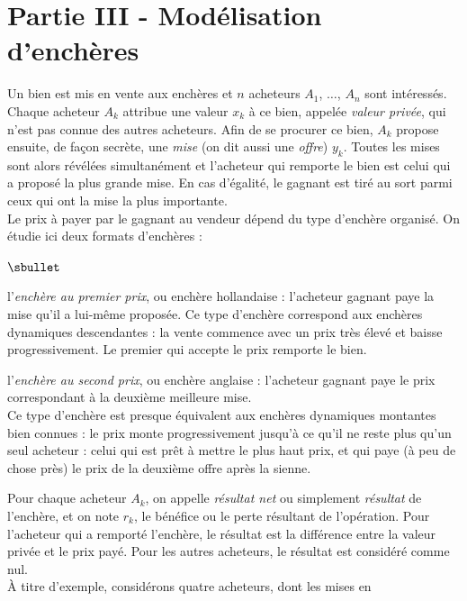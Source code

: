 \documentclass[11pt]{article}%
\begin{document}



\section*{Partie III - Modélisation d'enchères}

\noindent
Un bien est mis en vente aux enchères et $n$ acheteurs $A_1$, $\ldots$,
$A_n$ sont intéressés. Chaque acheteur $A_k$ attribue une valeur $x_k$ 
à ce bien, appelée \emph{valeur privée}, qui n'est pas connue des 
autres acheteurs. Afin de se procurer ce bien, $A_k$ propose ensuite, 
de façon secrète, une \emph{mise} (on dit aussi une \emph{offre}) 
$y_k$. Toutes les mises sont alors révélées simultanément et l'acheteur 
qui remporte le bien est celui qui a proposé la plus grande mise. En 
cas d'égalité, le gagnant est tiré au sort parmi ceux qui ont la mise 
la plus importante.\\
Le prix à payer par le gagnant au vendeur dépend du type d'enchère 
organisé. On étudie ici deux formats d'enchères :
\begin{noliste}{$\sbullet$}
  \item l'\emph{enchère au premier prix}, ou enchère hollandaise : 
  l'acheteur gagnant paye la mise qu'il a lui-même proposée. Ce type 
  d'enchère correspond aux enchères dynamiques \og descendantes \fg{} :
  la vente commence avec un prix très élevé et baisse progressivement.
  Le premier qui accepte le prix remporte le bien.
  
  \item l'\emph{enchère au second prix}, ou enchère anglaise : 
  l'acheteur gagnant paye le prix correspondant à la deuxième meilleure
  mise.\\
  Ce type d'enchère est presque équivalent aux enchères dynamiques \og
  montantes \fg{} bien connues : le prix monte progressivement 
  jusqu'à ce qu'il ne reste plus qu'un seul acheteur : celui qui est 
  prêt à mettre le plus haut prix, et qui paye (à peu de chose près) le
  prix de la deuxième offre après la sienne.
\end{noliste}
Pour chaque acheteur $A_k$, on appelle \emph{résultat net} ou 
simplement \emph{résultat} de l'enchère, et on note $r_k$, le bénéfice 
ou le perte résultant de l'opération. Pour l'acheteur qui a remporté 
l'enchère, le résultat est la différence entre la valeur privée et le 
prix payé. Pour les autres acheteurs, le résultat est considéré comme 
nul.\\
À titre d'exemple, considérons quatre acheteurs, dont les mises en 
\end{document}
